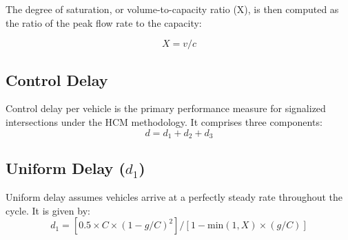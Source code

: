 The degree of saturation, or volume-to-capacity ratio (X), 
is then computed as the ratio of the peak flow rate to the 
capacity:

\begin{equation}
    X = v / c
\end{equation}




\subsection{Control Delay}

Control delay per vehicle is the primary performance 
measure for signalized intersections under the HCM 
methodology. It comprises three components:
\begin{equation}
    d = d_1 + d_2 + d_3
\end{equation}

\subsection{Uniform Delay ($d_1$)}

Uniform delay assumes vehicles arrive at a perfectly 
steady rate throughout the cycle. It is given by:
\begin{equation}
    d_1 = [0.5 \times C \times (1 - g/C)^2]  /  [1 - \text{min}(1, X) \times (g/C)]
\end{equation}


